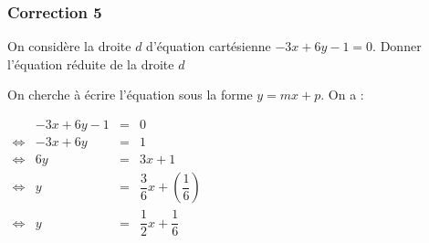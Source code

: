 \documentclass[15pt, mathserif]{beamer}
\begin{document}
\begin{frame}
\vspace{-10mm}
	\frametitle{Correction 5}
On considère la droite $d$ d'équation cartésienne $-3x+6y-1=0$. Donner l'équation réduite de la droite $d$ 
 
  \bigskip 
 
 On cherche à écrire l'équation sous la forme $y=mx+p$. On a : 
 
 \hfil $\begin{array}{crcl} 
 & -3x+6y-1&=&0 \\ 
 \Leftrightarrow & -3x+6y & =&1\\ 
 \Leftrightarrow & 6y &=&3x+1\\ 
 \Leftrightarrow & y &=& \dfrac{3}{6}x +\left( \dfrac{1}{6} \right)\\ 
 \Leftrightarrow & y &=&\dfrac{1}{2}x +\dfrac{1}{6}\end{array}$ 
 
 \end{frame}
\end{document}
